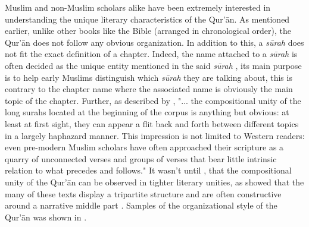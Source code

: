 Muslim and non-Muslim scholars alike have been extremely interested in understanding the unique literary characteristics of the Qur'\=an. As mentioned earlier, unlike other books like the Bible (arranged in chronological order), the Qur'\=an does not follow any obvious organization. In addition to this, a \textit{s\=urah}  does not fit the exact definition of a chapter. Indeed, the name attached to a \textit{s\=urah}  is often decided as the unique entity mentioned in the said \textit{s\=urah} , its main purpose is to help early Muslims distinguish which \textit{s\=urah}  they are talking about, this is contrary to the chapter name where the associated name is obviously the main topic of the chapter. Further, as described by , "... the compositional unity of the long surahs located at the beginning of the corpus is anything but obvious: at least at first sight, they can appear a flit back and forth between different topics in a largely haphazard manner. This impression is not limited to Western readers: even pre-modern Muslim scholars have often approached their scripture as a quarry of unconnected verses and groups of verses that bear little intrinsic relation to what precedes and follows." It wasn't until , that the compositional unity of the Qur'\=an can be observed in tighter literary unities, as  showed that the many of these texts display a tripartite structure and are often constructive around a narrative middle part \cite{sinai2017}. Samples of the organizational style of the Qur'\=an was shown in .
